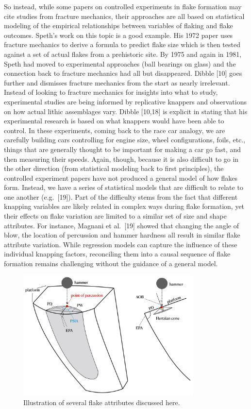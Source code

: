 \documentclass[10pt,letterpaper]{article}
\begin{document}
So instead, while some papers on controlled experiments in flake
formation may cite studies from fracture mechanics, their approaches are
all based on statistical modeling of the empirical relationships between
variables of flaking and flake outcomes. Speth's work on this topic is a
good example. His 1972 paper uses fracture mechanics to derive a formula
to predict flake size which is then tested against a set of actual
flakes from a prehistoric site. By 1975 and again in 1981, Speth had
moved to experimental approaches (ball bearings on glass) and the
connection back to fracture mechanics had all but disappeared. Dibble
{[}10{]} goes further and dismisses fracture mechanics from the start as
nearly irrelevant. Instead of looking to fracture mechanics for insights
into what to study, experimental studies are being informed by
replicative knappers and observations on how actual lithic assemblages
vary. Dibble {[}10,18{]} is explicit in stating that his experimental
research is based on what knappers would have been able to control. In
these experiments, coming back to the race car analogy, we are carefully
building cars controlling for engine size, wheel configurations, foils,
etc., things that are generally thought to be important for making a car
go fast, and then measuring their speeds. Again, though, because it is
also difficult to go in the other direction (from statistical modeling
back to first principles), the controlled experiment papers have not
produced a general model of how flakes form. Instead, we have a series
of statistical models that are difficult to relate to one another
(e.g.~{[}19{]}). Part of the difficulty stems from the fact that
different knapping variables are likely related in complex ways during
flake formation, yet their effects on flake variation are limited to a
similar set of size and shape attributes. For instance, Magnani et
al.~{[}19{]} showed that changing the angle of blow, the location of
percussion and hammer hardness all result in similar flake attribute
variation. While regression models can capture the influence of these
individual knapping factors, reconciling them into a causal sequence of
flake formation remains challenging without the guidance of a general
model.

\begin{figure}
\includegraphics[width=350px]{Figure_01} \caption{Illustration of several flake attributes discussed here.}\label{fig:fig1}
\end{figure}
\end{document}
